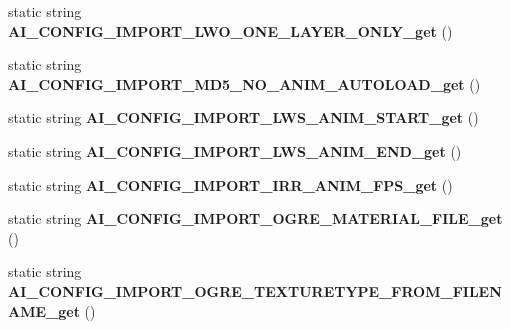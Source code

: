 \begin{DoxyCompactItemize}
\item 
\hypertarget{class_assimp_p_i_n_v_o_k_e_a4ae83fa1ead60fae39ed4e566df244f8}{static string {\bfseries A\+I\+\_\+\+C\+O\+N\+F\+I\+G\+\_\+\+I\+M\+P\+O\+R\+T\+\_\+\+L\+W\+O\+\_\+\+O\+N\+E\+\_\+\+L\+A\+Y\+E\+R\+\_\+\+O\+N\+L\+Y\+\_\+get} ()}\label{class_assimp_p_i_n_v_o_k_e_a4ae83fa1ead60fae39ed4e566df244f8}

\item 
\hypertarget{class_assimp_p_i_n_v_o_k_e_afa2d1ea18f2c5bc7843ea40ec61468af}{static string {\bfseries A\+I\+\_\+\+C\+O\+N\+F\+I\+G\+\_\+\+I\+M\+P\+O\+R\+T\+\_\+\+M\+D5\+\_\+\+N\+O\+\_\+\+A\+N\+I\+M\+\_\+\+A\+U\+T\+O\+L\+O\+A\+D\+\_\+get} ()}\label{class_assimp_p_i_n_v_o_k_e_afa2d1ea18f2c5bc7843ea40ec61468af}

\item 
\hypertarget{class_assimp_p_i_n_v_o_k_e_ad304c0f29f28f3aa9ec95aa2d5f1f363}{static string {\bfseries A\+I\+\_\+\+C\+O\+N\+F\+I\+G\+\_\+\+I\+M\+P\+O\+R\+T\+\_\+\+L\+W\+S\+\_\+\+A\+N\+I\+M\+\_\+\+S\+T\+A\+R\+T\+\_\+get} ()}\label{class_assimp_p_i_n_v_o_k_e_ad304c0f29f28f3aa9ec95aa2d5f1f363}

\item 
\hypertarget{class_assimp_p_i_n_v_o_k_e_a5fcb14cb2ff64421c9e7254d1606beb6}{static string {\bfseries A\+I\+\_\+\+C\+O\+N\+F\+I\+G\+\_\+\+I\+M\+P\+O\+R\+T\+\_\+\+L\+W\+S\+\_\+\+A\+N\+I\+M\+\_\+\+E\+N\+D\+\_\+get} ()}\label{class_assimp_p_i_n_v_o_k_e_a5fcb14cb2ff64421c9e7254d1606beb6}

\item 
\hypertarget{class_assimp_p_i_n_v_o_k_e_ad380329688826620228055ecf78ece95}{static string {\bfseries A\+I\+\_\+\+C\+O\+N\+F\+I\+G\+\_\+\+I\+M\+P\+O\+R\+T\+\_\+\+I\+R\+R\+\_\+\+A\+N\+I\+M\+\_\+\+F\+P\+S\+\_\+get} ()}\label{class_assimp_p_i_n_v_o_k_e_ad380329688826620228055ecf78ece95}

\item 
\hypertarget{class_assimp_p_i_n_v_o_k_e_a28b9800336655215cecde3c08a9998af}{static string {\bfseries A\+I\+\_\+\+C\+O\+N\+F\+I\+G\+\_\+\+I\+M\+P\+O\+R\+T\+\_\+\+O\+G\+R\+E\+\_\+\+M\+A\+T\+E\+R\+I\+A\+L\+\_\+\+F\+I\+L\+E\+\_\+get} ()}\label{class_assimp_p_i_n_v_o_k_e_a28b9800336655215cecde3c08a9998af}

\item 
\hypertarget{class_assimp_p_i_n_v_o_k_e_aaaed27bff5c1c79c512d839430c57bcb}{static string {\bfseries A\+I\+\_\+\+C\+O\+N\+F\+I\+G\+\_\+\+I\+M\+P\+O\+R\+T\+\_\+\+O\+G\+R\+E\+\_\+\+T\+E\+X\+T\+U\+R\+E\+T\+Y\+P\+E\+\_\+\+F\+R\+O\+M\+\_\+\+F\+I\+L\+E\+N\+A\+M\+E\+\_\+get} ()}\label{class_assimp_p_i_n_v_o_k_e_aaaed27bff5c1c79c512d839430c57bcb}


\end{DoxyCompactItemize}
